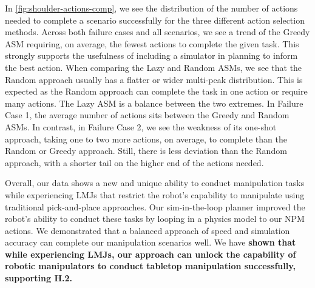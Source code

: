


In \cref{fig:shoulder-actions-comp}, we see the distribution of the number of actions needed to complete a scenario successfully for the three different action selection methods. Across both failure cases and all scenarios, we see a trend of the Greedy ASM requiring, on average, the fewest actions to complete the given task. This strongly supports the usefulness of including a simulator in planning to inform the best action. When comparing the Lazy and Random ASMs, we see that the Random approach usually has a flatter or wider multi-peak distribution. This is expected as the Random approach can complete the task in one action or require many actions. The Lazy ASM is a balance between the two extremes. In Failure Case 1, the average number of actions sits between the Greedy and Random ASMs. In contrast, in Failure Case 2, we see the weakness of its one-shot approach, taking one to two more actions, on average, to complete than the Random or Greedy approach. Still, there is less deviation than the Random approach, with a shorter tail on the higher end of the actions needed.

Overall, our data shows a new and unique ability to conduct manipulation tasks while experiencing LMJs that restrict the robot's capability to manipulate using traditional pick-and-place approaches. Our sim-in-the-loop planner improved the robot's ability to conduct these tasks by looping in a physics model to our NPM actions. We demonstrated that a balanced approach of speed and simulation accuracy can complete our manipulation scenarios well. We have \textbf{shown that while experiencing LMJs, our approach can unlock the capability of robotic manipulators to conduct tabletop manipulation successfully, supporting H.2.}
